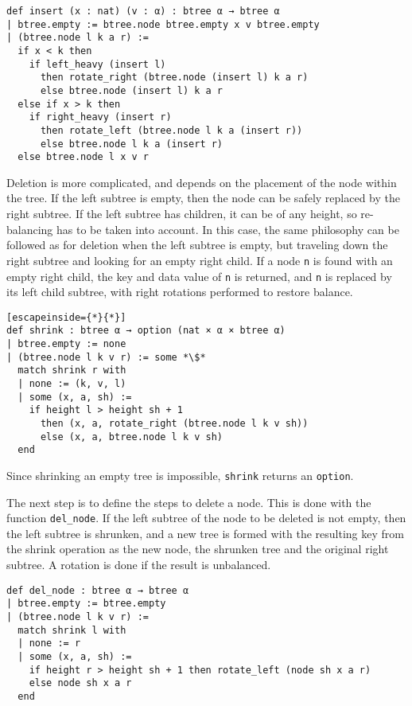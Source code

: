 \begin{lstlisting}
def insert (x : nat) (v : α) : btree α → btree α
| btree.empty := btree.node btree.empty x v btree.empty
| (btree.node l k a r) :=
  if x < k then 
    if left_heavy (insert l) 
      then rotate_right (btree.node (insert l) k a r)
      else btree.node (insert l) k a r
  else if x > k then
    if right_heavy (insert r) 
      then rotate_left (btree.node l k a (insert r))
      else btree.node l k a (insert r)
  else btree.node l x v r
\end{lstlisting}

Deletion is more complicated, and depends on the placement of the node within the tree. If the left subtree is empty, then the node can be safely replaced by the right subtree.  If the left subtree has children, it can be of any height, so re-balancing has to be taken into account. In this case, the same philosophy can be followed as for deletion when the left subtree is empty, but traveling down the right subtree and looking for an empty right child. If a node \lstinline{n} is found with an empty right child, the key and data value of \lstinline{n} is returned, and \lstinline{n} is replaced by its left child subtree, with right rotations performed to restore balance. 

\begin{lstlisting}[escapeinside={*}{*}]
def shrink : btree α → option (nat × α × btree α)
| btree.empty := none
| (btree.node l k v r) := some *\$*
  match shrink r with
  | none := (k, v, l)
  | some (x, a, sh) :=
    if height l > height sh + 1
      then (x, a, rotate_right (btree.node l k v sh))
      else (x, a, btree.node l k v sh)
  end
\end{lstlisting}

Since shrinking an empty tree is impossible, \lstinline{shrink} returns an \lstinline{option}.

The next step is to define the steps to delete a node. This is done with the function \lstinline{del_node}. If the left subtree of the node to be deleted is not empty, then the left subtree is shrunken, and a new tree is formed with the resulting key from the shrink operation as the new node, the shrunken tree and the original right subtree. A rotation is done if the result is unbalanced. 

\begin{lstlisting}
def del_node : btree α → btree α
| btree.empty := btree.empty
| (btree.node l k v r) :=
  match shrink l with 
  | none := r
  | some (x, a, sh) :=
    if height r > height sh + 1 then rotate_left (node sh x a r)
    else node sh x a r
  end
\end{lstlisting}

